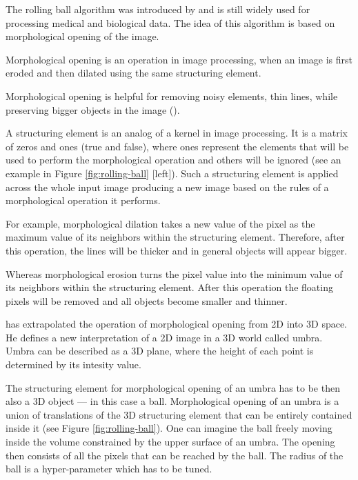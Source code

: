 The rolling ball algorithm was introduced by \cite{Sternberg_1983} and is still widely used for processing medical and biological data. The idea of this algorithm is based on morphological opening of the image. 

\begin{definition}
	Morphological opening is an operation in image processing, when an image is first eroded and then dilated using the same structuring element. 
\end{definition}

Morphological opening is helpful for removing noisy elements, thin lines, while preserving bigger objects in the image (\cite{morph_open}).

A structuring element is an analog of a kernel in image processing. It is a matrix of zeros and ones (true and false), where ones represent the elements that will be used to perform the morphological operation and others will be ignored (see an example in Figure \ref{fig:rolling-ball} [left]). Such a structuring element is applied across the whole input image producing a new image based on the rules of a morphological operation it performs.  

For example, morphological dilation takes a new value of the pixel as the maximum value of its neighbors within the structuring element. Therefore, after this operation, the lines will be thicker and in general objects will appear bigger.

Whereas morphological erosion turns the pixel value into the minimum value of its neighbors within the structuring element. After this operation the floating pixels will be removed and all objects become smaller and thinner.

\cite{Sternberg_1983} has extrapolated the operation of morphological opening from 2D into 3D space. He defines a new interpretation of a 2D image in a 3D world called umbra. Umbra can be described as a 3D plane, where the height of each point is determined by its intesity value.

The structuring element for morphological opening of an umbra has to be then also a 3D object --- in this case a ball. Morphological opening of an umbra is a union of translations of the 3D structuring element that can be entirely contained inside it (see Figure \ref{fig:rolling-ball}). One can imagine the ball freely moving inside the volume constrained by the upper surface of an umbra. The opening then consists of all the pixels that can be reached by the ball. The radius of the ball is a hyper-parameter which has to be tuned.

